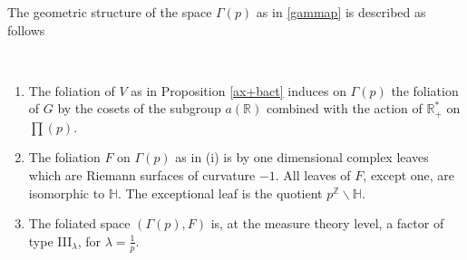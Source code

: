 \documentclass[graybox, envcountsect%
]{svmult}
\def\R{{\mathbb R}}
\def\Z{{\mathbb Z}}
\def\H{{\mathbb H}}
\def\no{\noindent}
\begin{document}
\no The geometric structure of the space $\Gamma(p)$ as in \eqref{gammap} is described as follows

\begin{theorem}\label{gammap1}\
\begin{enumerate}	
\item[(i)] The foliation of $V$ as in Proposition \ref{ax+bact} induces on $\Gamma(p)$ 
	the foliation of $G$ by 
	the cosets of the subgroup $a(\R)$ combined with the action of $\R_+^*$ on $\prod(p)$.
	\item[(ii)] The foliation $F$ on $\Gamma(p)$ as in (i) is by one dimensional complex   leaves which are Riemann surfaces of curvature $-1$. All leaves of $F$, except one, are isomorphic to $\H$. The exceptional leaf is the quotient  $p^\Z\backslash \H$. 
	\item[(iii)] The foliated space $(\Gamma(p),F)$ is, at the measure theory level, a factor of type III$_\lambda$, for $\lambda=\frac 1p$.
	\end{enumerate}
\end{theorem}
\end{document}
